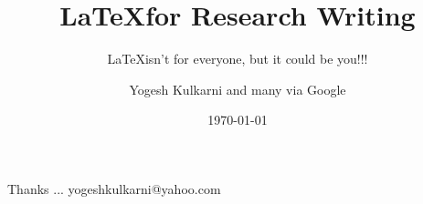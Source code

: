 \documentclass[xcolor=dvipsnames,compress,t,pdf,9pt]{beamer}
\title[\LaTeX \thickspace for Research \hspace{4cm} \insertframenumber /\inserttotalframenumber]{\LaTeX \thickspace for Research Writing}
\subtitle[]{\LaTeX \thinspace isn't for everyone, but it could be you!!!}
\author{Yogesh Kulkarni \tiny{and many via Google}}
\date[2014]{\today}
\begin{document}
\begin{frame}
\titlepage
\end{frame}



\begin{frame}[c]{}
Thanks ...
\vspace{5mm}
yogeshkulkarni@yahoo.com
\end{frame}
\end{document}
